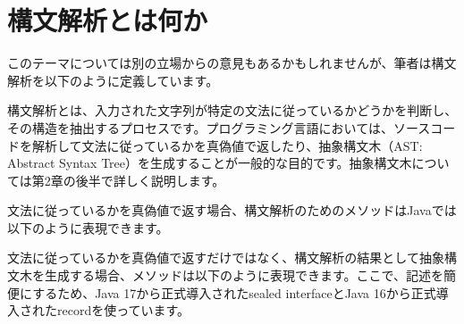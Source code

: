 \hypertarget{chapter1-ux69cbux6587ux89e3ux6790ux3068ux306fux4f55ux304b}{%
\section{構文解析とは何か}\label{chapter1-ux69cbux6587ux89e3ux6790ux3068ux306fux4f55ux304b}}

このテーマについては別の立場からの意見もあるかもしれませんが、筆者は構文解析を以下のように定義しています。

構文解析とは、入力された文字列が特定の文法に従っているかどうかを判断し、その構造を抽出するプロセスです。プログラミング言語においては、ソースコードを解析して文法に従っているかを真偽値で返したり、抽象構文木（AST:
Abstract Syntax
Tree）を生成することが一般的な目的です。抽象構文木については第2章の後半で詳しく説明します。

文法に従っているかを真偽値で返す場合、構文解析のためのメソッドはJavaでは以下のように表現できます。

\begin{Shaded}
\begin{Highlighting}[]
 \NormalTok{(}
\end{Highlighting}
\end{Shaded}

文法に従っているかを真偽値で返すだけではなく、構文解析の結果として抽象構文木を生成する場合、メソッドは以下のように表現できます。ここで、記述を簡便にするため、Java
17から正式導入されたsealed interfaceとJava
16から正式導入されたrecordを使っています。

\begin{Shaded}
\begin{Highlighting}[]
\NormalTok{ \{}
\NormalTok{(}
\NormalTok{\}}
\NormalTok{(}
\end{Highlighting}
\end{Shaded}

